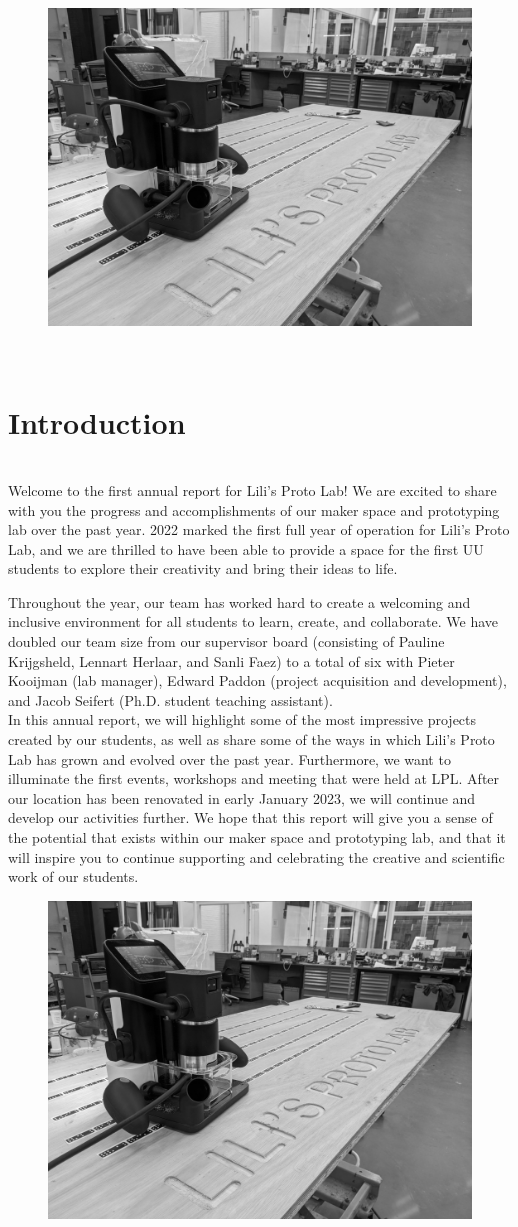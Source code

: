 \documentclass{report}
\newcommand\pagetitle{SectionTitle}
\newcommand{\LPLsection}[1]{%
\begin{figure}%
    \centering%
    \includegraphics[height=\textheight]{design_images/LPL_shaper.jpg}%
\end{figure}%
\clearpage%
\,\vspace{\textheight/3}%
\renewcommand\pagetitle{#1}%
\section*{\centering \pagetitle}%
\addcontentsline{toc}{section}{\protect\numberline{}\pagetitle}%
\clearpage%
}
\begin{document}
\LPLsection{Introduction}

 \\

Welcome to the first annual report for Lili's Proto Lab! We are excited to share with you the progress and accomplishments of our maker space and prototyping lab over the past year. 2022 marked the first full year of operation for Lili's Proto Lab, and we are thrilled to have been able to provide a space for the first UU students to explore their creativity and bring their ideas to life.

Throughout the year, our team has worked hard to create a welcoming and inclusive environment for all students to learn, create, and collaborate. We have doubled our team size from our supervisor board (consisting of Pauline Krijgsheld, Lennart Herlaar, and Sanli Faez) to a total of six with Pieter Kooijman (lab manager), Edward Paddon (project acquisition and development), and Jacob Seifert (Ph.D. student teaching assistant). \\

In this annual report, we will highlight some of the most impressive projects created by our students, as well as share some of the ways in which Lili's Proto Lab has grown and evolved over the past year. Furthermore, we want to illuminate the first events, workshops and meeting that were held at LPL. After our location has been renovated in early January 2023, we will continue and develop our activities further. We hope that this report will give you a sense of the potential that exists within our maker space and prototyping lab, and that it will inspire you to continue supporting and celebrating the creative and scientific work of our students. 

\clearpage

\begin{figure}
    \centering
    \includegraphics[height=\textheight]{design_images/LPL_shaper.jpg}
\end{figure}
\clearpage
\,\vspace{\textheight/3}
\renewcommand\pagetitle{Overview}   %
\end{document}
